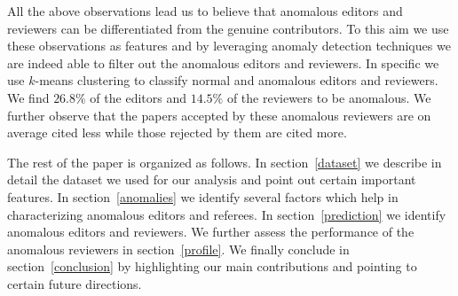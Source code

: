  All the above observations lead us to believe that anomalous editors and reviewers can be differentiated from the genuine contributors. To this aim we use these observations as features and by leveraging anomaly detection techniques we are indeed able to filter out the anomalous editors and reviewers. In specific we use $k$-means clustering \cite{hartigan1979algorithm} to classify normal and anomalous editors and reviewers.
We find $26.8\%$ of the editors and $14.5\%$ of the reviewers to be anomalous.
We further observe that the papers accepted by these anomalous reviewers are on average cited less while those rejected by them are cited more. 


 The rest of the paper is organized as follows. In section~\ref{dataset} we describe in detail the dataset we used for our analysis and point out certain important features. In section~\ref{anomalies} we identify several factors which help in characterizing anomalous editors and referees. In section~\ref{prediction} we identify anomalous editors and reviewers. 
We further assess the performance of the anomalous reviewers in section~\ref{profile}. 
We finally conclude in section~\ref{conclusion} by highlighting our main contributions and pointing to certain future directions.

\medskip